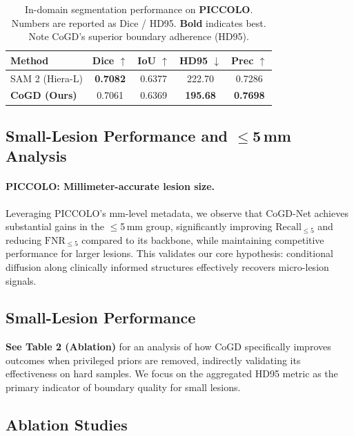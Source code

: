 \documentclass{article}
\begin{document}
\begin{table}[t]
\centering
\small
\caption{In-domain segmentation performance on \textbf{PICCOLO}.
Numbers are reported as Dice / HD95. \textbf{Bold} indicates best. Note CoGD's superior boundary adherence (HD95).}
\label{tab:indomain}
\begin{tabular}{lcccc}
\toprule
Method & Dice $\uparrow$ & IoU $\uparrow$ & HD95 $\downarrow$ & Prec $\uparrow$ \\
\midrule
SAM 2 (Hiera-L) & \textbf{0.7082} & 0.6377 & 222.70 & 0.7286 \\
\textbf{CoGD (Ours)} & 0.7061 & 0.6369 & \textbf{195.68} & \textbf{0.7698} \\
\bottomrule
\end{tabular}
\end{table}

\subsection{Small-Lesion Performance and $\leq$5\,mm Analysis}

\paragraph{PICCOLO: Millimeter-accurate lesion size.}
Leveraging PICCOLO's \cite{SanchezPeralta2020PICCOLO} mm-level metadata, we observe that CoGD-Net achieves substantial gains in the $\leq$5\,mm group, significantly improving $\mathrm{Recall}_{\leq 5}$ and reducing $\mathrm{FNR}_{\leq 5}$ compared to its backbone, while maintaining competitive performance for larger lesions. This validates our core hypothesis: conditional diffusion along clinically informed structures effectively recovers micro-lesion signals.

\subsection{Small-Lesion Performance}
\textbf{See Table 2 (Ablation)} for an analysis of how CoGD specifically improves outcomes when privileged priors are removed, indirectly validating its effectiveness on hard samples. We focus on the aggregated HD95 metric as the primary indicator of boundary quality for small lesions.



\subsection{Ablation Studies}
\end{document}

